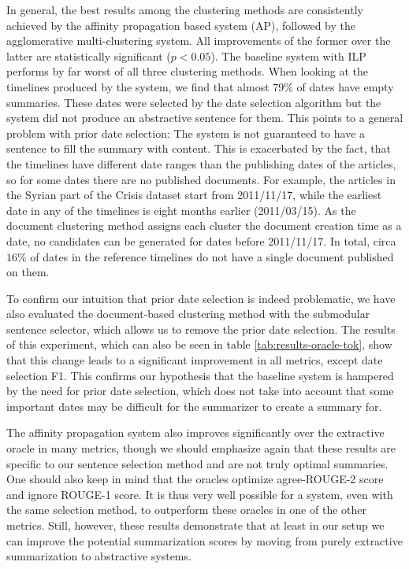 \documentclass[a4paper,BCOR=10mm]{report}
\numberwithin{lemma}{chapter}
\numberwithin{definition}{chapter}
\begin{document}
In general, the best results among the clustering methods are consistently achieved by the affinity propagation based system (AP), followed by the agglomerative multi-clustering system. All improvements of the former over the latter are statistically significant ($p < 0.05$). The baseline system with ILP performs by far worst of all three clustering methods. When looking at the timelines produced by the system, we find that almost $79\%$ of dates have empty summaries. These dates were selected by the date selection algorithm but the system did not produce an abstractive sentence for them. This points to a general problem with prior date selection: The system is not guaranteed to have a sentence to fill the summary with content. This is exacerbated by the fact, that the timelines have different date ranges than the publishing dates of the articles, so for some dates there are no published documents. For example, the articles in the Syrian part of the Crisis dataset start from 2011/11/17, while the earliest date in any of the timelines is eight months earlier (2011/03/15). As the document clustering method assigns each cluster the document creation time as a date, no candidates can be generated for dates before 2011/11/17. In total, circa $16\%$ of dates in the reference timelines do not have a single document published on them.

To confirm our intuition that prior date selection is indeed problematic, we have also evaluated the document-based clustering method with the submodular sentence selector, which allows us to remove the prior date selection. The results of this experiment, which can also be seen in table \ref{tab:results-oracle-tok}, show that this change leads to a significant improvement in all metrics, except date selection F1.
This confirms our hypothesis that the baseline system is hampered by the need for prior date selection, which does not take into account that some important dates may be difficult for the summarizer to create a summary for.



The affinity propagation system also improves significantly over the extractive oracle in many metrics, though we should emphasize again that these results are specific to our sentence selection method and are not truly optimal summaries. One should also keep in mind that the oracles optimize agree-ROUGE-2 score and ignore ROUGE-1 score. It is thus very well possible for a system, even with the same selection method, to outperform these oracles in one of the other metrics. Still, however, these results demonstrate that at least in our setup we can improve the potential summarization scores by moving from purely extractive summarization to abstractive systems.
\end{document}
